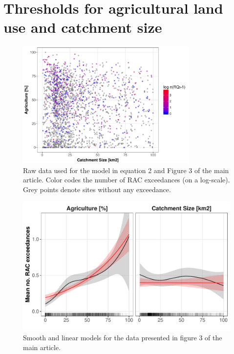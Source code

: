 \documentclass[pdftex,
	a4paper,
	titlepage=false]{scrreprt}
\begin{document}

\newpage





\chapter{Thresholds for agricultural land use and catchment size}
\begin{figure}[ht]
	\centering
	\includegraphics[width = 0.8\textwidth]{ezgagrirac}
	\caption[Raw data used for the model in equation 2 and Figure 3 of the main article.]{Raw data used for the model in equation 2 and Figure 3 of the main article. Color codes the number of RAC exceedances (on a log-scale). Grey points denote sites without any exceedance.}
	\label{fig:ezgagrirac}
\end{figure}


\begin{figure}[ht]
	\centering
	\includegraphics[width = \textwidth]{smooth_lin.pdf}
	\caption[Smooth and linear fit]{Smooth and linear models for the data presented in figure 3 of the main article.}
	\label{fig:smooth_lin}
\end{figure}
\end{document}
